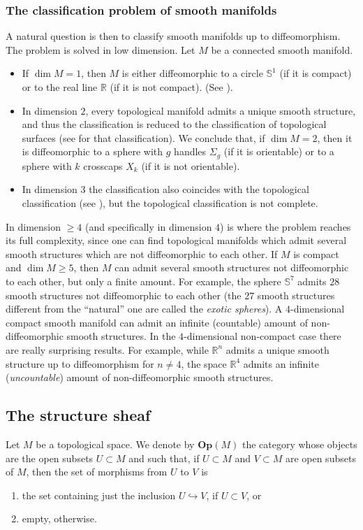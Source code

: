 \documentclass[11pt,a4paper]{book}
\theoremstyle{remark} \newtheorem{rmk}[thm]{Remark}
\theoremstyle{definition} \newtheorem{defn}[thm]{Definition}
\theoremstyle{definition} \newtheorem{ex}[thm]{Example}
\theoremstyle{definition} \newtheorem{ej}[thm]{Exercise}
\begin{document}
\subsubsection{The classification problem of smooth manifolds}
A natural question is then to classify smooth manifolds up to diffeomorphism. The problem is solved in low dimension. Let $M$ be a connected smooth manifold.
\begin{itemize}
\item If $\dim M = 1$, then $M$ is either diffeomorphic to a circle $\mathbb{S}^1$ (if it is compact) or to the real line $\mathbb{R}$ (if it is not compact). (See ).
\item In dimension $2$, every topological manifold admits a unique smooth structure, and thus the classification is reduced to the classification of topological surfaces (see  for that classification). We conclude that, if $\dim M =2$, then it is diffeomorphic to a sphere with $g$ handles $\Sigma_g$ (if it is orientable) or to a sphere with $k$ crosscaps $X_k$ (if it is not orientable).
\item In dimension $3$ the classification also coincides with the topological classification (see ), but the topological classification is not complete.
\end{itemize}

In dimension $\geq 4$ (and specifically in dimension $4$) is where the problem reaches its full complexity, since one can find topological manifolds which admit several smooth structures which are not diffeomorphic to each other. If $M$ is compact and $\dim M \geq 5$, then $M$ can admit several smooth structures not diffeomorphic to each other, but only a finite amount. For example, the sphere $\mathbb{S}^7$ admits $28$ smooth structures not diffeomorphic to each other (the $27$ smooth structures different from the ``natural'' one are called the \emph{exotic spheres}). A $4$-dimensional compact smooth manifold can admit an infinite (countable) amount of non-diffeomorphic smooth structures. In the $4$-dimensional non-compact case there are really surprising results. For example, while $\mathbb{R}^n$ admits a unique smooth structure up to diffeomorphism for $n\neq 4$, the space $\mathbb{R}^4$ admits an infinite (\emph{uncountable}) amount of non-diffeomorphic smooth structures.

\subsection{The structure sheaf}
Let $M$ be a topological space. We denote by $\mathbf{Op}(M)$ the category whose objects are the open subsets $U\subset M$ and such that, if $U\subset M$ and $V\subset M$ are open subsets of $M$, then the set of morphisms from $U$ to $V$ is
\begin{enumerate}
\item the set containing just the inclusion $U\hookrightarrow V$, if $U\subset V$, or
        \item empty, otherwise.
\end{enumerate}
\end{document}
